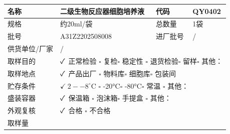 \documentclass[UTF8,10pt,a4paper,fontset=fandol]{ctexart}
\newcommand{\fieldvalue}[1]{#1}
\newcommand{\handwritten}[1]{#1}
\begin{document}
\begin{tabularx}{\textwidth}{|p{2.2cm}|X|p{2.2cm}|X|}
\hline
名称 &
\fieldvalue{二级生物反应器细胞培养液} &
代码 &
\fieldvalue{QY0402}
\\ \hline
规格 &
\fieldvalue{约20ml/袋} &
总数量 &
\fieldvalue{1袋}
\\ \hline
批号 &
\fieldvalue{A31Z2202508008} &
进厂批号 &
\fieldvalue{/}
\\ \hline
供货单位/厂家 &
\multicolumn{3}{l|}{%
\fieldvalue{/}} \\ \hline
取样目的 &
\multicolumn{3}{l|}{%
\fieldvalue{\handwritten{✓\ 正常检验}}\qquad
$\square$ 复检\qquad $\square$ 稳定性
\newline
$\square$ 退货检验\qquad $\square$ 留样\qquad $\square$ 其他：\underline{\hspace{2cm}}
} \\ \hline
取样地点 &
\multicolumn{3}{l|}{%
\fieldvalue{\handwritten{✓\ 产品出厂}}\qquad
$\square$ 物料库\qquad $\square$ 细胞库\qquad $\square$ 包装间
} \\ \hline
贮存条件 &
\multicolumn{3}{l|}{%
$\fieldvalue{\handwritten{✓\ 2--8^\circ\mathrm{C}}}$\qquad
$\square$ -20°C\qquad $\square$ -80°C\qquad $\square$ 常温\qquad
$\square$ 其他：\underline{\hspace{1.5cm}}
} \\ \hline
盛装容器 &
\multicolumn{3}{l|}{%
\fieldvalue{\handwritten{✓\ 保温箱}}\qquad
$\square$ 泡沫箱\qquad $\square$ 手提盒\qquad
$\square$ 其他：\underline{\hspace{2cm}}
} \\ \hline
外观复核 &
\multicolumn{3}{l|}{%
\fieldvalue{\handwritten{✓\ 合格}}\qquad
$\square$ 不合格
} \\ \hline
取样量 &

\end{tabularx}
\end{document}
